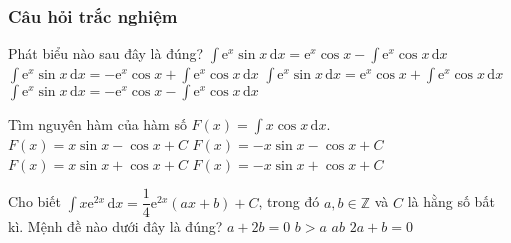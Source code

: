 \subsubsection{Câu hỏi trắc nghiệm}
\begin{ex}%
	Phát biểu nào sau đây là đúng?
	\choice
	{$\displaystyle\int\mathrm{e}^x\sin x\mathrm{\,d}x=\mathrm{e}^x\cos x-\displaystyle\int\mathrm{e}^x\cos x\mathrm{\,d}x$}
	{\True $\displaystyle\int\mathrm{e}^x\sin x\mathrm{\,d}x=-\mathrm{e}^x\cos x+\displaystyle\int\mathrm{e}^x\cos x\mathrm{\,d}x$}
	{$\displaystyle\int\mathrm{e}^x\sin x\mathrm{\,d}x=\mathrm{e}^x\cos x+\displaystyle\int\mathrm{e}^x\cos x\mathrm{\,d}x$}
	{$\displaystyle\int\mathrm{e}^x\sin x\mathrm{\,d}x=-\mathrm{e}^x\cos x-\displaystyle\int\mathrm{e}^x\cos x\mathrm{\,d}x$}
\end{ex}
\begin{ex}%
	Tìm nguyên hàm của hàm số $F(x)=\displaystyle\int x\cos x\mathrm{\,d}x$. 
	\choice
	{$F(x)=x\sin x-\cos x+C$}
	{$F(x)=-x\sin x-\cos x+C$}
	{\True $F(x)=x\sin x+\cos x+C$}
	{$F(x)=-x\sin x+\cos x+C$}
\end{ex}
\begin{ex}%
	Cho biết $\displaystyle\int x\mathrm{e}^{2x}\mathrm{\,d}x =\dfrac{1}{4}\mathrm{e}^{2x}(ax+b)+C$, trong đó $a,b\in\mathbb{Z}$ và $C$ là hằng số bất kì. Mệnh đề nào dưới đây là đúng?
	\choice
	{\True $a+2b=0$}
	{$b>a$}
	{$ab$}
	{$2a+b=0$}
\end{ex}
